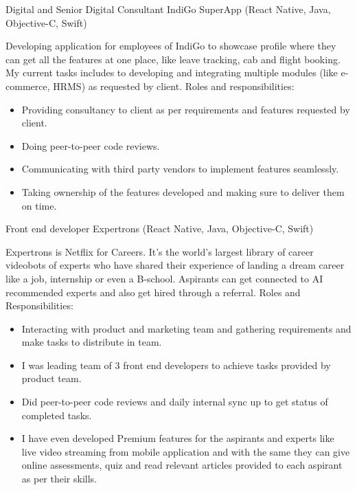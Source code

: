 \begin{cventries}
\cventry
    {Digital and Senior Digital Consultant}
    {IndiGo SuperApp \tiny(React Native, Java, Objective-C, Swift)} %
    {} %
    {} %
    {
        Developing application for employees of IndiGo to showcase profile where they can get all the features at one place, like leave tracking, cab and flight booking. My current tasks includes to developing and integrating multiple modules (like e-commerce, HRMS) as requested by client.
        \newline Roles and responsibilities:
        \begin{itemize}
            \item Providing consultancy to client as per requirements and features requested by client.
            \item Doing peer-to-peer code reviews.
            \item Communicating with third party vendors to implement features seamlessly.
            \item Taking ownership of the features developed and making sure to deliver them on time.
        \end{itemize}
    }

  \cventry
    {Front end developer}
    {Expertrons \tiny(React Native, Java, Objective-C, Swift)} %
    {} %
    {} %
    {
        Expertrons is Netflix for Careers. It's the world's largest library of career videobots of experts who have shared their experience of landing a dream career like a job, internship or even a B-school. Aspirants can get connected to AI recommended experts and also get hired through a referral. 
        \newline Roles and Responsibilities: \begin{itemize}
            \item Interacting with product and marketing team and gathering requirements and make tasks to distribute in team.
            \item I was leading team of 3 front end developers to achieve tasks provided by product team.
            \item Did peer-to-peer code reviews and daily internal sync up to get status of completed tasks.
            \item I have even developed Premium features for the aspirants and experts like live video streaming from mobile application and with the same they can give online assessments, quiz and read relevant articles provided to each aspirant as per their skills.
        \end{itemize} 
    }



\end{cventries}
